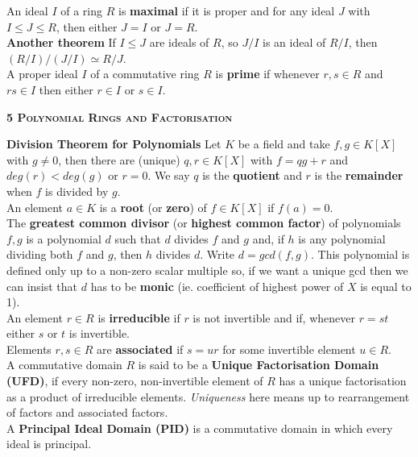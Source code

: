 \documentclass[a4paper]{article}
\begin{document}
\begin{framed}
	\noindent
	An ideal $I$ of a ring $R$ is \textbf{maximal} if it is proper and for any ideal $J$ with $I \leq J \leq R$, then either $J = I$ or $J = R$.\\
	
	\noindent
	\textbf{Another theorem} If $I \leq J$ are ideals of $R$, so $J/I$ is an ideal of $R/I$, then $(R/I)/(J/I) \simeq R/J$.\\
	
	\noindent
	A proper ideal $I$ of a commutative ring $R$ is \textbf{prime} if whenever $r, s \in R$ and $rs \in I$ then either $r \in I$ or $s \in I$.
\end{framed}

\newpage
\begin{framed}
	\begin{center}
		\textbf{\textsc{5 Polynomial Rings and Factorisation}}
	\end{center}
	\textbf{Division Theorem for Polynomials} Let $K$ be a field and take $f, g \in K[X]$ with $g \neq 0$, then there are (unique) $q, r \in K[X]$ with $f = qg + r$ and $deg(r) < deg(g)$ or $r = 0$. We say $q$ is the \textbf{quotient} and $r$ is the \textbf{remainder} when $f$ is divided by $g$.\\
	
	\noindent
	An element $a \in K$ is a \textbf{root} (or \textbf{zero}) of $f \in K[X]$ if $f(a) = 0$.\\
	
	\noindent
	The \textbf{greatest common divisor} (or \textbf{highest common factor}) of polynomials $f, g$ is a polynomial $d$ such that $d$ divides $f$ and $g$ and, if $h$ is any polynomial dividing both $f$ and $g$, then $h$ divides $d$. Write $d = gcd(f, g)$. This polynomial is defined only up to a non-zero scalar multiple so, if we want a unique gcd then we can insist that $d$ has to be \textbf{monic} (ie. coefficient of highest power of $X$ is equal to 1).\\
	
	\noindent
	An element $r \in R$ is \textbf{irreducible} if $r$ is not invertible and if, whenever $r = st$ either $s$ or $t$ is invertible.\\
	
	\noindent
	Elements $r, s \in R$ are \textbf{associated} if $s = ur$ for some invertible element $u \in R$.\\
	
	\noindent
	A commutative domain $R$ is said to be a \textbf{Unique Factorisation Domain (UFD)}, if every non-zero, non-invertible element of $R$ has a unique factorisation as a product of irreducible elements. \textit{Uniqueness} here means up to rearrangement of factors and associated factors.\\
	
	\noindent
	A \textbf{Principal Ideal Domain (PID)} is a commutative domain in which every ideal is principal.
\end{framed}
\end{document}
